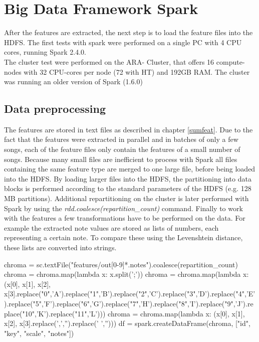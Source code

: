 
\section{Big Data Framework Spark}\label{bds1}

After the features are extracted, the next step is to load the feature files into the HDFS. 
The first tests with spark were performed on a single PC with 4 CPU cores, running Spark 2.4.0.\\ The cluster test were performed on the ARA- Cluster, that offers 16 compute-nodes with 32 CPU-cores per node (72 with HT) and 192GB RAM. The cluster was running an older version of Spark (1.6.0)\\

\subsection{Data preprocessing}

The features are stored in text files as described in chapter \ref{sumfeat}. Due to the fact that the features were extracted in parallel and in batches of only a few songs, each of the feature files only contain the features of a small number of songs. Because many small files are inefficient to process with Spark \cite[p. 153]{sparkbook1} all files containing the same feature type are merged to one large file, before being loaded into the HDFS. By loading larger files into the HDFS, the partitioning into data blocks is performed according to the standard parameters of the HDFS (e.g. 128 MB partitions). Additional repartitioning on the cluster is later performed with Spark by using the \textit{rdd.coalesce(repartition\_count)} command. 
Finally to work with the features a few transformations have to be performed on the data. For example the extracted note values are stored as lists of numbers, each representing a certain note. To compare these using the Levenshtein distance, these lists are converted into strings. 

\begin{pythonCode}
chroma = sc.textFile("features/out[0-9]*.notes").coalesce(repartition_count)
chroma = chroma.map(lambda x: x.split(';'))
chroma = chroma.map(lambda x: (x[0], x[1], x[2], x[3].replace("0",'A').replace("1",'B').replace("2",'C').replace("3",'D').replace("4",'E').replace("5",'F').replace("6",'G').replace("7",'H').replace("8",'I').replace("9",'J').replace("10",'K').replace("11",'L')))
chroma = chroma.map(lambda x: (x[0], x[1], x[2], x[3].replace(',','').replace(' ','')))
df = spark.createDataFrame(chroma, ["id", "key", "scale", "notes"])
\end{pythonCode}

